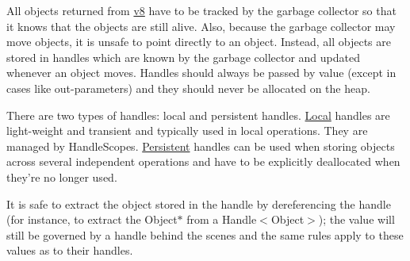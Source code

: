 All objects returned from \hyperlink{namespacev8}{v8} have to be tracked by the garbage collector so that it knows that the objects are still alive. Also, because the garbage collector may move objects, it is unsafe to point directly to an object. Instead, all objects are stored in handles which are known by the garbage collector and updated whenever an object moves. Handles should always be passed by value (except in cases like out-\/parameters) and they should never be allocated on the heap.

There are two types of handles\-: local and persistent handles. \hyperlink{classv8_1_1Local}{Local} handles are light-\/weight and transient and typically used in local operations. They are managed by Handle\-Scopes. \hyperlink{classv8_1_1Persistent}{Persistent} handles can be used when storing objects across several independent operations and have to be explicitly deallocated when they're no longer used.

It is safe to extract the object stored in the handle by dereferencing the handle (for instance, to extract the Object$\ast$ from a Handle$<$\-Object$>$); the value will still be governed by a handle behind the scenes and the same rules apply to these values as to their handles. 

